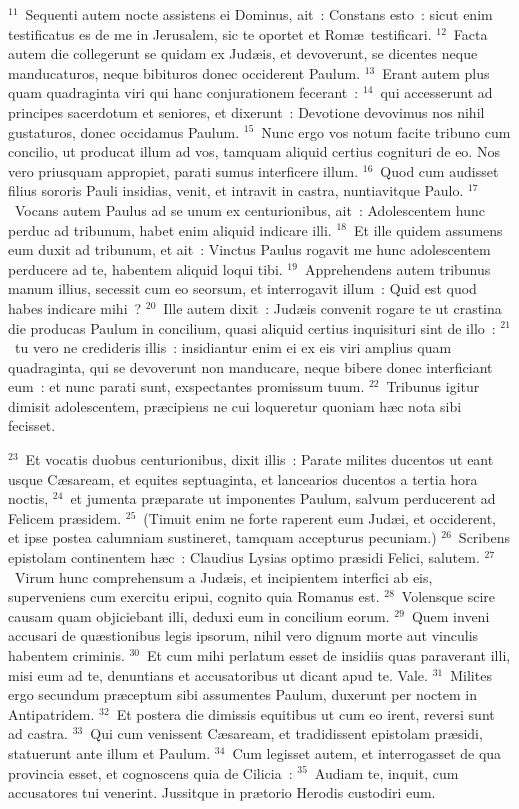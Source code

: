 ${}^{11}$~Sequenti autem nocte assistens ei Dominus, ait~: Constans esto~: sicut enim testificatus es de me in Jerusalem, sic te oportet et Rom\ae\ testificari.
${}^{12}$~Facta autem die collegerunt se quidam ex Jud\ae is, et devoverunt, se dicentes neque manducaturos, neque bibituros donec occiderent Paulum.
${}^{13}$~Erant autem plus quam quadraginta viri qui hanc conjurationem fecerant~:
${}^{14}$~qui accesserunt ad principes sacerdotum et seniores, et dixerunt~: Devotione devovimus nos nihil gustaturos, donec occidamus Paulum.
${}^{15}$~Nunc ergo vos notum facite tribuno cum concilio, ut producat illum ad vos, tamquam aliquid certius cognituri de eo. Nos vero priusquam appropiet, parati sumus interficere illum.
${}^{16}$~Quod cum audisset filius sororis Pauli insidias, venit, et intravit in castra, nuntiavitque Paulo.
${}^{17}$~Vocans autem Paulus ad se unum ex centurionibus, ait~: Adolescentem hunc perduc ad tribunum, habet enim aliquid indicare illi.
${}^{18}$~Et ille quidem assumens eum duxit ad tribunum, et ait~: Vinctus Paulus rogavit me hunc adolescentem perducere ad te, habentem aliquid loqui tibi.
${}^{19}$~Apprehendens autem tribunus manum illius, secessit cum eo seorsum, et interrogavit illum~: Quid est quod habes indicare mihi~?
${}^{20}$~Ille autem dixit~: Jud\ae is convenit rogare te ut crastina die producas Paulum in concilium, quasi aliquid certius inquisituri sint de illo~:
${}^{21}$~tu vero ne credideris illis~: insidiantur enim ei ex eis viri amplius quam quadraginta, qui se devoverunt non manducare, neque bibere donec interficiant eum~: et nunc parati sunt, exspectantes promissum tuum.
${}^{22}$~Tribunus igitur dimisit adolescentem, pr\ae cipiens ne cui loqueretur quoniam h\ae c nota sibi fecisset.


${}^{23}$~Et vocatis duobus centurionibus, dixit illis~: Parate milites ducentos ut eant usque C\ae saream, et equites septuaginta, et lancearios ducentos a tertia hora noctis,
${}^{24}$~et jumenta pr\ae parate ut imponentes Paulum, salvum perducerent ad Felicem pr\ae sidem.
${}^{25}$~(Timuit enim ne forte raperent eum Jud\ae i, et occiderent, et ipse postea calumniam sustineret, tamquam accepturus pecuniam.)
${}^{26}$~Scribens epistolam continentem h\ae c~: Claudius Lysias optimo pr\ae sidi Felici, salutem.
${}^{27}$~Virum hunc comprehensum a Jud\ae is, et incipientem interfici ab eis, superveniens cum exercitu eripui, cognito quia Romanus est.
${}^{28}$~Volensque scire causam quam objiciebant illi, deduxi eum in concilium eorum.
${}^{29}$~Quem inveni accusari de qu\ae stionibus legis ipsorum, nihil vero dignum morte aut vinculis habentem criminis.
${}^{30}$~Et cum mihi perlatum esset de insidiis quas paraverant illi, misi eum ad te, denuntians et accusatoribus ut dicant apud te. Vale.
${}^{31}$~Milites ergo secundum pr\ae ceptum sibi assumentes Paulum, duxerunt per noctem in Antipatridem.
${}^{32}$~Et postera die dimissis equitibus ut cum eo irent, reversi sunt ad castra.
${}^{33}$~Qui cum venissent C\ae saream, et tradidissent epistolam pr\ae sidi, statuerunt ante illum et Paulum.
${}^{34}$~Cum legisset autem, et interrogasset de qua provincia esset, et cognoscens quia de Cilicia~:
${}^{35}$~Audiam te, inquit, cum accusatores tui venerint. Jussitque in pr\ae torio Herodis custodiri eum.


